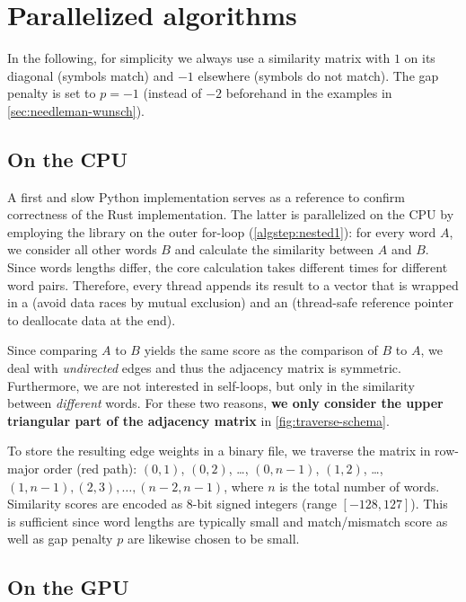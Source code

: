 \section{Parallelized algorithms}
\label{sec:impl}

In the following, for simplicity we always use a similarity matrix with $1$ on its diagonal (symbols match) and $-1$ elsewhere (symbols do not match). The gap penalty is set to $p=-1$ (instead of $-2$ beforehand in the examples in \autoref{sec:needleman-wunsch}).

\subsection{On the CPU}

A first and slow Python implementation serves as a reference to confirm correctness of the Rust implementation. The latter is parallelized on the CPU by employing the  library on the outer for-loop (\autoref{algstep:nested1}): for every word $A$, we consider all other words $B$ and calculate the similarity between $A$ and $B$. Since words lengths differ, the core calculation takes different times for different word pairs. Therefore, every thread appends its result to a vector that is wrapped in a  (avoid data races by mutual exclusion) and an  (thread-safe reference pointer to deallocate data at the end).

Since comparing $A$ to $B$ yields the same score as the comparison of $B$ to $A$, we deal with \textit{undirected} edges and thus the adjacency matrix is symmetric. Furthermore, we are not interested in self-loops, but only in the similarity between \textit{different} words. For these two reasons, \textbf{we only consider the upper triangular part of the adjacency matrix} in \autoref{fig:traverse-schema}.

To store the resulting edge weights in a binary file, we traverse the matrix in row-major order (red path): $(0,1)$, $(0,2)$, \ldots, $(0,n-1)$, $(1,2)$, \ldots, $(1,n-1), (2,3), \ldots, (n-2,n-1)$, where $n$ is the total number of words. Similarity scores are encoded as 8-bit signed integers (range $[-128,127]$). This is sufficient since word lengths are typically small and match/mismatch score as well as gap penalty $p$ are likewise chosen to be small.


\subsection{On the GPU}

